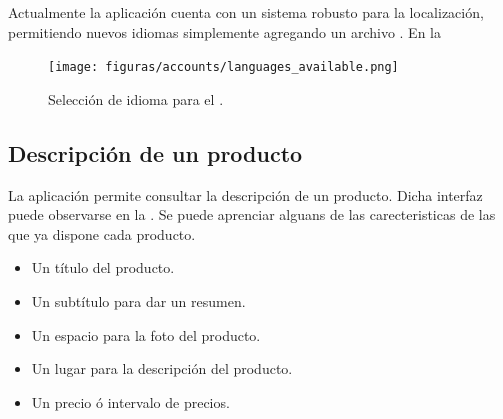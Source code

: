 Actualmente la aplicación cuenta con un sistema robusto para la localización, permitiendo nuevos idiomas simplemente agregando un archivo \jsonNAME. En la 


\begin{figure}[H]
	\centering
	\texttt{[image: figuras/accounts/languages\_available.png]}

	\caption{Selección de idioma para el \websitesINT.}
	\label{figure:features:languages_available}
\end{figure}


\subsection{Descripción de un producto}

La aplicación permite consultar la descripción de un producto. Dicha interfaz puede observarse en la . Se puede aprenciar alguans de las carecteristicas de las que ya dispone cada producto.

\begin{itemize}
	\item
		Un título del producto.
	\item
		Un subtítulo para dar un resumen.
	\item
		Un espacio para la foto del producto.
	\item
		Un lugar para la descripción del producto.
	\item
		Un precio ó intervalo de precios.
\end{itemize}

